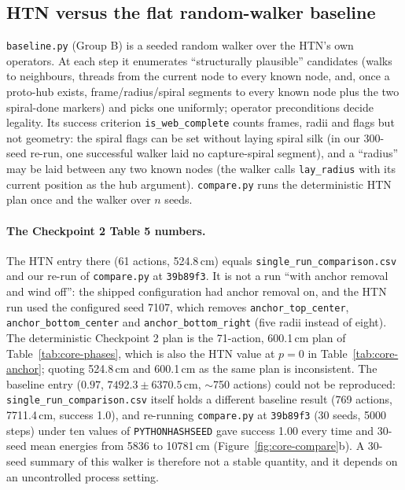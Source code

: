 \FloatBarrier

\subsection{HTN versus the flat random-walker baseline}
\label{sec:core-compare}

\texttt{baseline.py} (Group B) is a seeded random walker over the HTN's own operators. At each step it
enumerates ``structurally plausible'' candidates (walks to neighbours, threads from the current node to
every known node, and, once a proto-hub exists, frame/radius/spiral segments to every known node plus the
two spiral-done markers) and picks one uniformly; operator preconditions decide legality. Its success
criterion \texttt{is\_web\_complete} counts frames, radii and flags but not geometry: the spiral flags can
be set without laying spiral silk (in our 300-seed re-run, one successful walker laid no capture-spiral
segment), and a ``radius'' may be laid between any two known nodes (the walker calls
\texttt{lay\_radius} with its current position as the hub argument). \texttt{compare.py} runs the deterministic HTN plan once
and the walker over $n$ seeds.

\paragraph{The Checkpoint 2 Table 5 numbers.} The HTN entry there (61 actions, 524.8\,cm) equals
\texttt{single\_run\_comparison.csv} and our re-run of \texttt{compare.py} at \texttt{39b89f3}. It is not a
run ``with anchor removal and wind off'': the shipped configuration had anchor removal on, and the HTN run
used the configured seed 7107, which removes \texttt{anchor\_top\_center}, \texttt{anchor\_bottom\_center}
and \texttt{anchor\_bottom\_right} (five radii instead of eight). The deterministic Checkpoint 2 plan is the
71-action, 600.1\,cm plan of Table~\ref{tab:core-phases}, which is also the HTN value at $p=0$ in
Table~\ref{tab:core-anchor}; quoting 524.8\,cm and 600.1\,cm as the same plan is inconsistent. The baseline
entry ($0.97$, $7492.3\pm6370.5$\,cm, $\sim$750 actions) could not be reproduced:
\texttt{single\_run\_comparison.csv} itself holds a different baseline result (769 actions, 7711.4\,cm,
success 1.0), and re-running \texttt{compare.py} at \texttt{39b89f3} (30 seeds, 5000 steps) under ten
values of \texttt{PYTHONHASHSEED} gave success 1.00 every time and 30-seed mean energies from 5836 to
10781\,cm (Figure~\ref{fig:core-compare}b). A 30-seed summary of this walker is therefore not a stable
quantity, and it depends on an uncontrolled process setting.

